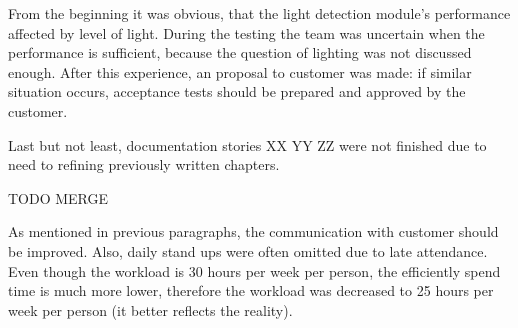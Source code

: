 From the beginning it was obvious, that the light detection module's performance affected by level of light.
During the testing the team was uncertain when the performance is sufficient, because the question of lighting was not discussed enough.
After this experience, an proposal to customer was made: if similar situation occurs, acceptance tests should be prepared and approved by the customer.

Last but not least, documentation stories XX YY ZZ were not finished due to need to refining previously written chapters.

TODO MERGE

As mentioned in previous paragraphs, the communication with customer should be improved.
Also, daily stand ups were often omitted due to late attendance.
Even though the workload is 30 hours per week per person, the efficiently spend time is much more lower, therefore the workload was decreased to 25 hours per week per person (it better reflects the reality).